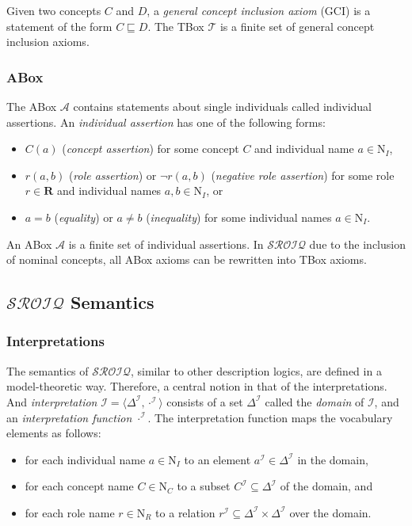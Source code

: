 Given two concepts $C$ and $D$, a \emph{general concept inclusion axiom} (GCI) \emph{}is a statement of the form $C \sqsubseteq D$. The TBox $\mathcal{T}$ is a finite set of general concept inclusion axioms.

\subsubsection{ABox}

The ABox $\mathcal{A}$ contains statements about single individuals called individual assertions. An \emph{individual assertion} has one of the following forms:

\begin{itemize}
    \item $C(a)$ (\emph{concept assertion}) for some concept $C$ and individual name $a \in \mathrm{N}_I$,
    \item$r(a, b)$ (\emph{role assertion}) or $\lnot r (a, b)$ (\emph{negative role assertion}) for some role $r \in \mathbf{R}$ and individual names $a, b \in \mathrm{N}_I$, or
    \item $a = b$ (\emph{equality}) or $a \not = b$ (\emph{inequality}) for some individual names $a \in \mathrm{N}_I$.
\end{itemize}

An ABox $\mathcal{A}$ is a finite set of individual assertions. In $\mathcal{SROIQ}$ due to the inclusion of nominal concepts, all ABox axioms can be rewritten into TBox axioms.

\subsection{$\mathcal{SROIQ}$ Semantics}

\subsubsection{Interpretations}

The semantics of $\mathcal{SROIQ}$, similar to other description logics, are defined in a model-theoretic way. Therefore, a central notion in that of the interpretations. And \emph{interpretation} $\mathcal{I} = \langle \Delta^\mathcal{I}, \cdot^\mathcal{I} \rangle$ consists of a set $\Delta^\mathcal{I}$ called the \emph{domain} of $\mathcal{I}$, and an \emph{interpretation function} $\cdot^\mathcal{I}$. The interpretation function maps the vocabulary elements as follows:

\begin{itemize}
    \item for each individual name $a \in \mathrm{N}_I$ to an element $a^\mathcal{I} \in \Delta^\mathcal{I}$ in the domain,
    \item for each concept name $C \in \mathrm{N}_C$ to a subset $C^\mathcal{I} \subseteq \Delta^\mathcal{I}$ of the domain, and
    \item for each role name $r \in \mathrm{N}_R$ to a relation $r^\mathcal{I} \subseteq \Delta^\mathcal{I} \times \Delta^\mathcal{I}$ over the domain.
\end{itemize}

